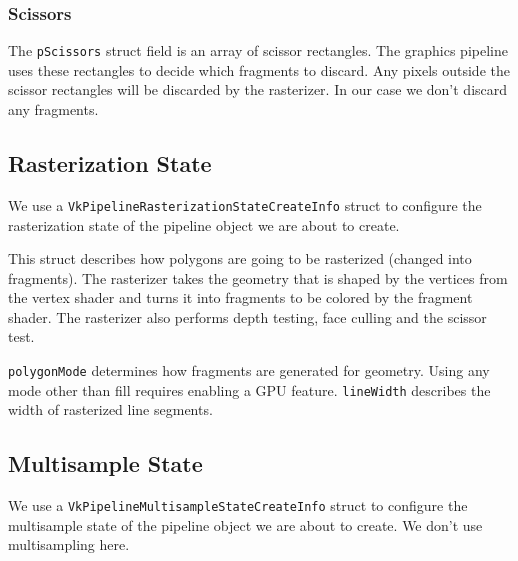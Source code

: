 \subsubsection{Scissors}

The \texttt{pScissors} struct field
is an array of scissor rectangles.
The graphics pipeline uses these rectangles to decide which fragments to discard.
Any pixels outside the scissor rectangles will be discarded by the rasterizer.
In our case we don't discard any fragments.

\begin{minipage}{\linewidth}{\noindent}
    
\end{minipage}

\subsection{Rasterization State}

We use a \texttt{VkPipelineRasterizationStateCreateInfo} struct to configure
the rasterization state of the pipeline object we are about to create.

This struct describes how polygons are going to be rasterized
(changed into fragments).
The rasterizer takes the geometry that is shaped by the vertices from the
vertex shader and turns it into fragments to be colored by the fragment shader.
The rasterizer also performs depth testing, face culling and the scissor test.

\begin{minipage}{\linewidth}{\noindent}
    
\end{minipage}

\texttt{polygonMode} determines how fragments are generated for geometry.
Using any mode other than fill requires enabling a GPU feature.
\texttt{lineWidth} describes the width of rasterized line segments.

\subsection{Multisample State}

We use a \texttt{VkPipelineMultisampleStateCreateInfo} struct to configure
the multisample state of the pipeline object we are about to create.
We don't use multisampling here.

